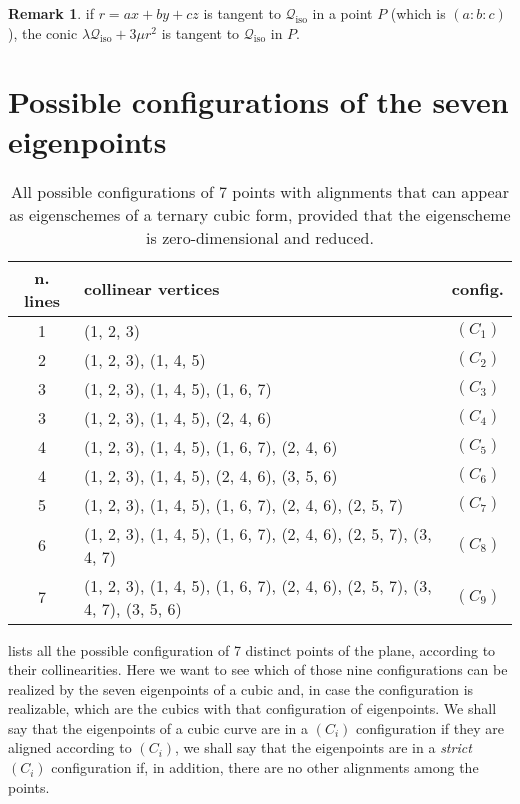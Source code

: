 \documentclass{amsart}
\theoremstyle{plain}
\theoremstyle{definition}
\newtheorem{rmk}[lemma]{Remark}
\newcommand{\iso}{\mathcal{Q}_{\mathrm{iso}}}
\begin{document}
\begin{rmk}
if $r=ax+by+cz$ is tangent to $\iso$ in a point $P$ (which is $(a:b:c)$), 
the conic $\lambda \iso +3 \mu r^2$ is tangent to $\iso$ in $P$.
\end{rmk}


\section{Possible configurations of the seven eigenpoints}
\label{further_alignments}

\begin{table}
\caption{All possible configurations of $7$ points with alignments that can appear as eigenschemes of a ternary cubic form, provided that the eigenscheme is zero-dimensional and reduced.}
\centering
\begin{tabular}{|clc|}\hline
  n. lines & collinear vertices & config.\\ \hline
 1& (1, 2, 3) &  $(C_1)$\\
 2& (1, 2, 3), (1, 4, 5) &  $(C_2)$\\
 3& (1, 2, 3), (1, 4, 5), (1, 6, 7) & $(C_3)$\\
 3& (1, 2, 3), (1, 4, 5), (2, 4, 6) & $(C_4)$\\
 4& (1, 2, 3), (1, 4, 5), (1, 6, 7), (2, 4, 6) & $(C_5)$\\
 4& (1, 2, 3), (1, 4, 5), (2, 4, 6), (3, 5, 6) & $(C_6)$\\
 5& (1, 2, 3), (1, 4, 5), (1, 6, 7), (2, 4, 6), (2, 5, 7)& $(C_7)$\\
 6& (1, 2, 3), (1, 4, 5), (1, 6, 7), (2, 4, 6), (2, 5, 7), (3, 4, 7)& $(C_8)$\\
 7& (1, 2, 3), (1, 4, 5), (1, 6, 7), (2, 4, 6), (2, 5, 7), (3, 4, 7), (3, 5, 6) &  $(C_9)$\\ \hline
\end{tabular}
\label{table:all_alignments}
\end{table}
%
 lists all the possible configuration
of 7 distinct points of the plane, according to their collinearities. Here
we want to see which of those nine configurations can be realized by
the seven eigenpoints of a cubic and, in case the configuration is
realizable, which are the cubics with that configuration of eigenpoints.
We shall say that the eigenpoints of a cubic curve are in a $(C_i)$ 
configuration if they are aligned according to $(C_i)$, we shall say 
that the eigenpoints are in a \emph{strict} $(C_i)$ configuration if, 
in addition, there are no other alignments among the points.
\end{document}
